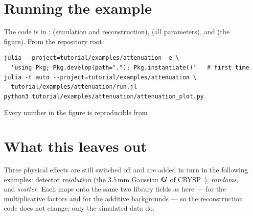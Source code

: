 \documentclass[11pt,a4paper]{article}
\begin{document}
\section{Running the example}
\label{sec:ex-att:run}

The code is in :  (simulation
and reconstruction),  (all parameters), and
 (the figure). From the repository root:
\begin{lstlisting}
julia --project=tutorial/examples/attenuation -e \
  'using Pkg; Pkg.develop(path="."); Pkg.instantiate()'   # first time
julia -t auto --project=tutorial/examples/attenuation \
  tutorial/examples/attenuation/run.jl
python3 tutorial/examples/attenuation/attenuation_plot.py
\end{lstlisting}
Every number in the figure is reproducible from .

\section{What this leaves out}
\label{sec:ex-att:next}

Three physical effects are still switched off and are added in turn in the
following examples: detector \emph{resolution} (the $3.5\,\mathrm{mm}$ Gaussian
$\bm{G}$ of CRYSP~\cite{crysp2026}), \emph{randoms}, and \emph{scatter}. Each maps
onto the same two library fields as here --- \code{mult} for the multiplicative
factors and \code{contamination} for the additive backgrounds --- so the
reconstruction code does not change; only the simulated data do.


\end{document}
